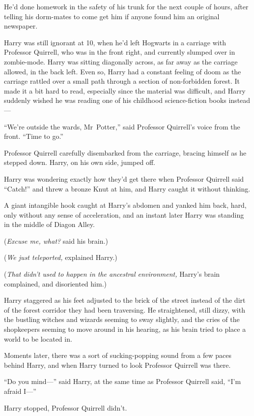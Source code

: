 He’d done homework in the safety of his trunk for the next couple of hours, after telling his dorm-mates to come get him if anyone found him an original newspaper.

Harry was still ignorant at 10\am, when he’d left Hogwarts in a carriage with Professor Quirrell, who was in the front right, and currently slumped over in zombie-mode. Harry was sitting diagonally across, as far away as the carriage allowed, in the back left. Even so, Harry had a constant feeling of doom as the carriage rattled over a small path through a section of non-forbidden forest. It made it a bit hard to read, especially since the material was difficult, and Harry suddenly wished he was reading one of his childhood science-fiction books instead—

“We’re outside the wards, Mr~Potter,” said Professor Quirrell’s voice from the front.
“Time to go.”

Professor Quirrell carefully disembarked from the carriage, bracing himself as he stepped down. Harry, on his own side, jumped off.

Harry was wondering exactly how they’d get there when Professor Quirrell said
“Catch!” and threw a bronze Knut at him, and Harry caught it without thinking.

A giant intangible hook caught at Harry’s abdomen and yanked him back, hard, only without any sense of acceleration, and an instant later Harry was standing in the middle of Diagon Alley.

(\emph{Excuse me, what?} said his brain.)

(\emph{We just teleported,} explained Harry.)

(\emph{That didn’t used to happen in the ancestral environment,} Harry’s brain complained, and disoriented him.)

Harry staggered as his feet adjusted to the brick of the street instead of the dirt of the forest corridor they had been traversing. He straightened, still dizzy, with the bustling witches and wizards seeming to sway slightly, and the cries of the shopkeepers seeming to move around in his hearing, as his brain tried to place a world to be located in.

Moments later, there was a sort of sucking-popping sound from a few paces behind Harry, and when Harry turned to look Professor Quirrell was there.

“Do you mind—” said Harry, at the same time as Professor Quirrell said,
“I’m afraid I—”

Harry stopped, Professor Quirrell didn’t.

